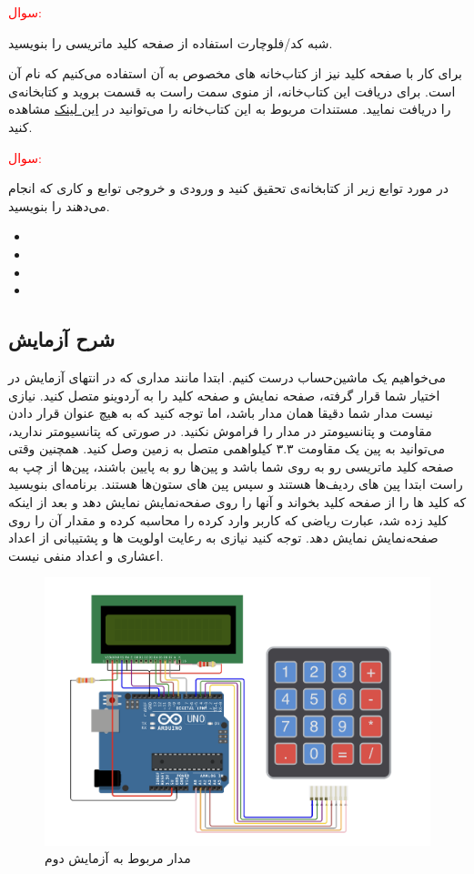 \newline
\textcolor{red}{\begin{nas}سوال: \end{nas}}
شبه کد/فلوچارت استفاده از صفحه کلید ماتریسی را بنویسید.
\newline

برای کار با صفحه کلید نیز از کتاب‌خانه های مخصوص به آن استفاده می‌کنیم که نام آن  است.
برای دریافت این کتاب‌خانه، از منوی سمت راست  به قسمت  بروید و کتابخانه‌ی  را دریافت نمایید. مستندات مربوط به این کتاب‌خانه را می‌توانید در 
\href{https://playground.arduino.cc/Code/Keypad/}{این لینک}
مشاهده کنید.
\newline
\textcolor{red}{\begin{nas}سوال: \end{nas}}
در مورد توابع زیر از کتابخانه‌ی  تحقیق کنید و ورودی و خروجی توابع و کاری که انجام می‌دهند را بنویسید.
\begin{itemize}
    \item {}
    \item {}
    \item {}
    \item {}
\end{itemize}
\newline
\subsection{شرح آزمایش}

می‌خواهیم یک ماشین‌حساب درست کنیم. ابتدا مانند مداری که در انتهای آزمایش در اختیار شما قرار گرفته، صفحه نمایش و صفحه کلید را به آردوینو متصل کنید. نیازی نیست مدار شما دقیقا همان مدار باشد، اما توجه کنید که به هیچ عنوان قرار دادن مقاومت و پتانسیومتر در مدار را فراموش نکنید. در صورتی که پتانسیومتر ندارید، می‌توانید به پین  یک مقاومت ۳.۳ کیلواهمی متصل به زمین وصل کنید. همچنین وقتی صفحه کلید ماتریسی رو به روی شما باشد و پین‌ها رو به پایین باشند، پین‌ها از چپ به راست ابتدا پین های ردیف‌ها هستند و سپس پین های ستون‌ها هستند. برنامه‌ای بنویسید که کلید ها را از صفحه کلید بخواند و آنها را روی صفحه‌نمایش نمایش دهد و بعد از اینکه کلید \lr{=} زده شد، عبارت ریاضی که کاربر وارد کرده را محاسبه کرده و مقدار آن را روی صفحه‌نمایش نمایش دهد.
توجه کنید نیازی به رعایت اولویت ها و پشتیبانی از اعداد اعشاری و اعداد منفی نیست.

\begin{figure}[h]
    \centering
    \includegraphics[width=14cm]{L2-Circuit.png}
    \caption{مدار مربوط به آزمایش دوم}
    \label{fig:l2-circ}
\end{figure}

\newline